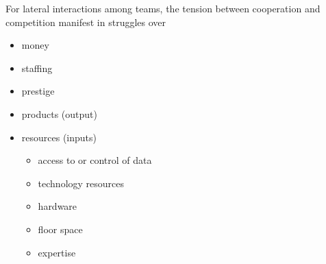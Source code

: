 For lateral interactions among teams, the tension between cooperation and competition manifest in struggles over
\begin{itemize}
    \item money
    \item staffing
    \item prestige
    \item products (output)
    \item resources (inputs)
    \begin{itemize}
        \item access to or control of data
        \item technology resources
        \item hardware
        \item floor space
        \item expertise
    \end{itemize}
\end{itemize}


